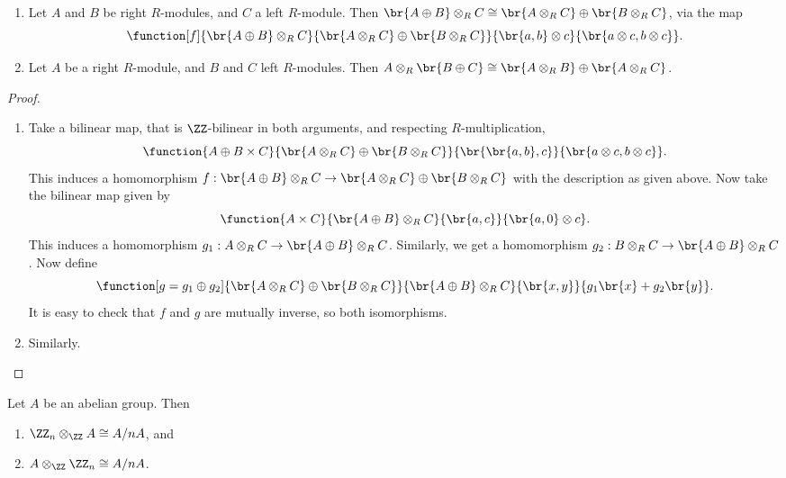 \pagebreak

\begin{corollary}
\hfill
\begin{enumerate}
\item Let $ A $ and $ B $ be right $ R $-modules, and $ C $ a left $ R $-module. Then $ \br{A \oplus B} \otimes_R C \cong \br{A \otimes_R C} \oplus \br{B \otimes_R C} $, via the map
$$ \function[f]{\br{A \oplus B} \otimes_R C}{\br{A \otimes_R C} \oplus \br{B \otimes_R C}}{\br{a, b} \otimes c}{\br{a \otimes c, b \otimes c}}. $$
\item Let $ A $ be a right $ R $-module, and $ B $ and $ C $ left $ R $-modules. Then $ A \otimes_R \br{B \oplus C} \cong \br{A \otimes_R B} \oplus \br{A \otimes_R C} $.
\end{enumerate}
\end{corollary}

\begin{proof}
\hfill
\begin{enumerate}
\item Take a bilinear map, that is $ \ZZ $-bilinear in both arguments, and respecting $ R $-multiplication,
$$ \function{A \oplus B \times C}{\br{A \otimes_R C} \oplus \br{B \otimes_R C}}{\br{\br{a, b}, c}}{\br{a \otimes c, b \otimes c}}. $$
This induces a homomorphism $ f : \br{A \oplus B} \otimes_R C \to \br{A \otimes_R C} \oplus \br{B \otimes_R C} $ with the description as given above. Now take the bilinear map given by
$$ \function{A \times C}{\br{A \oplus B} \otimes_R C}{\br{a, c}}{\br{a, 0} \otimes c}. $$
This induces a homomorphism $ g_1 : A \otimes_R C \to \br{A \oplus B} \otimes_R C $. Similarly, we get a homomorphism $ g_2 : B \otimes_R C \to \br{A \oplus B} \otimes_R C $. Now define
$$ \function[g = g_1 \oplus g_2]{\br{A \otimes_R C} \oplus \br{B \otimes_R C}}{\br{A \oplus B} \otimes_R C}{\br{x, y}}{g_1\br{x} + g_2\br{y}}. $$
It is easy to check that $ f $ and $ g $ are mutually inverse, so both isomorphisms.
\item Similarly.
\end{enumerate}
\end{proof}

\begin{corollary}
Let $ A $ be an abelian group. Then
\begin{enumerate}
\item $ \ZZ_n \otimes_\ZZ A \cong A / nA $, and
\item $ A \otimes_\ZZ \ZZ_n \cong A / nA $.
\end{enumerate}
\end{corollary}

